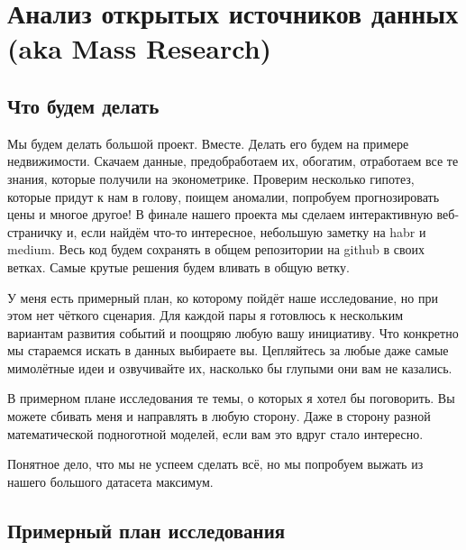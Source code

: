 \documentclass[12pt, a4paper, oneside]{article}
\begin{document}
\section*{Анализ открытых источников данных (aka Mass Research)} 


\subsection*{Что будем делать}

Мы будем делать большой проект.  Вместе. Делать его будем на примере недвижимости. Скачаем данные, предобработаем их, обогатим, отработаем все те знания, которые получили на эконометрике. Проверим несколько гипотез, которые придут к нам в голову, поищем аномалии, попробуем прогнозировать цены и многое другое! В финале нашего проекта мы сделаем интерактивную веб-страничку и, если найдём что-то интересное, небольшую заметку на habr и medium. Весь код будем сохранять в общем репозитории на github в своих ветках. Самые крутые решения будем вливать в общую ветку. 

У меня есть примерный план, ко которому пойдёт наше исследование, но при этом нет чёткого сценария. Для каждой пары я готовлюсь к нескольким вариантам развития событий и поощряю любую вашу инициативу. Что конкретно мы стараемся искать в данных выбираете вы. Цепляйтесь за любые даже самые мимолётные идеи и озвучивайте их, насколько бы глупыми они вам не казались. 

В примерном плане исследования те темы, о которых я хотел бы поговорить. Вы можете сбивать меня и направлять в любую сторону. Даже в сторону разной математической подноготной моделей, если вам это вдруг стало интересно.  

Понятное дело, что мы не успеем сделать всё, но мы попробуем выжать из нашего большого датасета максимум. 


\subsection*{ Примерный план исследования}
\end{document}
